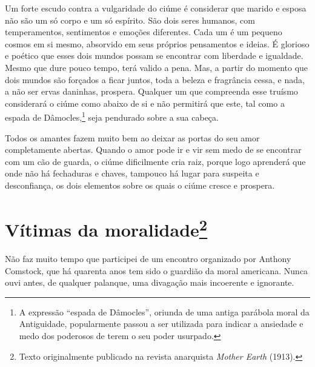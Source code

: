Um forte escudo contra a vulgaridade do ciúme é considerar que marido e
esposa não são um só corpo e um só espírito. São dois seres humanos, com
temperamentos, sentimentos e emoções diferentes. Cada um é um pequeno
cosmos em si mesmo, absorvido em seus próprios pensamentos e ideias. É
glorioso e poético que esses dois mundos possam se encontrar com
liberdade e igualdade. Mesmo que dure pouco tempo, terá valido a pena.
Mas, a partir do momento que dois mundos são forçados a ficar juntos,
toda a beleza e fragrância cessa, e nada, a não ser ervas daninhas,
prospera. Qualquer um que compreenda esse truísmo considerará o ciúme
como abaixo de si e não permitirá que este, tal como a espada de
Dâmocles,\footnote{A expressão ``espada de Dâmocles'', oriunda de uma antiga parábola moral da Antiguidade, popularmente passou a ser utilizada para indicar a ansiedade e medo dos poderosos de terem o seu poder usurpado.} seja pendurado sobre a sua cabeça.

Todos os amantes fazem muito bem ao deixar as portas do seu amor
completamente abertas. Quando o amor pode ir e vir sem medo de se
encontrar com um cão de guarda, o ciúme dificilmente cria raiz, porque
logo aprenderá que onde não há fechaduras e chaves, tampouco há lugar
para suspeita e desconfiança, os dois elementos sobre os quais o ciúme
cresce e prospera.

\chapter{Vítimas da moralidade\footnote{Texto originalmente publicado na revista
  anarquista \emph{Mother Earth} (1913).}}

Não faz muito tempo que participei de um encontro organizado por Anthony
Comstock, que há quarenta anos tem sido o guardião da moral americana.
Nunca ouvi antes, de qualquer palanque, uma divagação mais incoerente e
ignorante.

